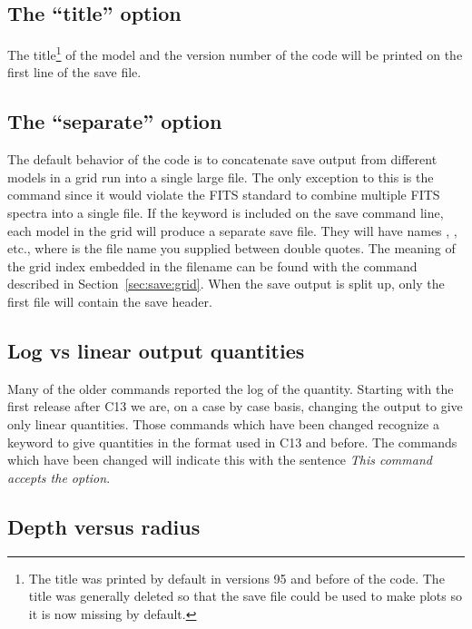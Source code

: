 \subsection{The ``title'' option}

The title\footnote{The title was printed by default in versions 95 and before of the
code.  The title was generally deleted so that the save file could be used
to make plots so it is now missing by default.} of the model and the version number of the code will be printed
on the first line of the save file.

\subsection{The ``separate'' option}
\label{sec:save:separate}

The default behavior of the code is to concatenate save output from different
models in a grid run into a single large file. The only exception to this is
the  command since it would violate the FITS standard to
combine multiple FITS spectra into a single file. If the keyword
 is included on the save command line, each model in the
grid will produce a separate save file. They will have names
, ,
etc., where  is the file name you supplied between double
quotes. The meaning of the grid index embedded in the filename can be found
with the  command described in
Section~\ref{sec:save:grid}. When the save output is split up, only the first
file will contain the save header.

\subsection{Log vs linear output quantities}
\label{sec:SaveLogOption}

Many of the older  commands reported the log of the quantity.
Starting with the first release after C13 we are, on a case by case basis, changing
the output to give only linear quantities.
Those  commands which have been changed recognize a
 keyword to give quantities in the format used in C13 and before.
The commands which have been changed will indicate this with the sentence
\emph{This command accepts the  option}.

\subsection{Depth versus radius}


